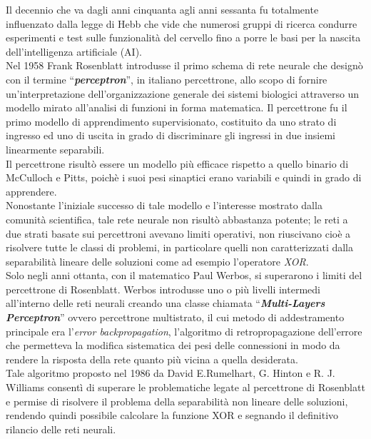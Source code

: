 \documentclass[12pt,a4paper,oneside]{book}
\begin{document}
	    Il decennio che va dagli anni cinquanta agli anni sessanta fu totalmente influenzato dalla legge di Hebb che vide che numerosi gruppi di ricerca condurre esperimenti e test sulle funzionalità del cervello fino a porre le basi per la nascita dell'intelligenza artificiale (AI).\\
	    Nel 1958 Frank Rosenblatt introdusse il primo schema di rete neurale che designò con il termine ``\textbf{\emph{perceptron}}'', in italiano percettrone, allo scopo di fornire un'interpretazione dell'organizzazione generale dei sistemi biologici attraverso un modello mirato all'analisi di funzioni in forma matematica. Il percettrone fu il primo modello di apprendimento supervisionato, costituito da uno strato di ingresso ed uno di uscita in grado di discriminare gli ingressi in due insiemi linearmente separabili.\\
	    Il percettrone risultò essere un modello più efficace rispetto a quello binario di McCulloch e Pitts, poichè i suoi pesi sinaptici erano variabili e quindi in grado di apprendere.\\
		Nonostante l'iniziale successo di tale modello e l'interesse mostrato dalla comunità scientifica, tale rete neurale non risultò abbastanza potente; le reti a due strati basate sui percettroni avevano limiti operativi, non riuscivano cioè a risolvere tutte le classi di problemi, in particolare quelli non caratterizzati dalla separabilità lineare delle soluzioni come ad esempio l'operatore \emph{XOR}.\\
		Solo negli anni ottanta, con il matematico Paul Werbos, si superarono i limiti del percettrone di Rosenblatt.  Werbos introdusse uno o più livelli intermedi all'interno delle reti neurali creando una classe chiamata  ``\textbf{\emph{Multi-Layers Perceptron}}'' ovvero percettrone multistrato, il cui metodo di addestramento principale era l'\emph{error backpropagation}, l'algoritmo di retropropagazione dell'errore che permetteva la modifica sistematica dei pesi delle connessioni in modo da rendere la risposta della rete quanto più vicina a quella desiderata.\\
		Tale algoritmo proposto nel 1986 da David E.Rumelhart, G. Hinton e R. J. Williams consentì di superare le problematiche legate al percettrone di Rosenblatt e permise di risolvere il problema della separabilità non lineare delle soluzioni, rendendo quindi possibile calcolare la funzione XOR e segnando il definitivo rilancio delle reti neurali.
		
		
		
\end{document}
